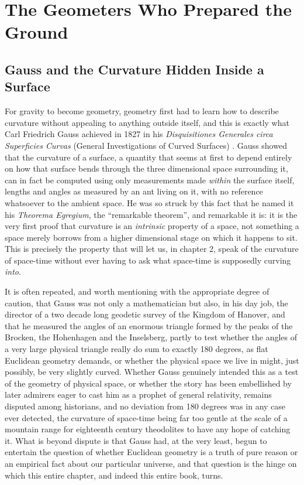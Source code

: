 \section{The Geometers Who Prepared the Ground}

    \subsection{Gauss and the Curvature Hidden Inside a Surface}

    For gravity to become geometry, geometry first had to learn how to describe curvature without appealing to anything outside itself, and this is exactly what Carl Friedrich Gauss achieved in 1827 in his \textit{Disquisitiones Generales circa Superficies Curvas} (General Investigations of Curved Surfaces) \citep{gauss1828}. Gauss showed that the curvature of a surface, a quantity that seems at first to depend entirely on how that surface bends through the three dimensional space surrounding it, can in fact be computed using only measurements made \textit{within} the surface itself, lengths and angles as measured by an ant living on it, with no reference whatsoever to the ambient space. He was so struck by this fact that he named it his \textit{Theorema Egregium}, the ``remarkable theorem'', and remarkable it is: it is the very first proof that curvature is an \textit{intrinsic} property of a space, not something a space merely borrows from a higher dimensional stage on which it happens to sit. This is precisely the property that will let us, in chapter 2, speak of the curvature of space-time without ever having to ask what space-time is supposedly curving \textit{into}.

    It is often repeated, and worth mentioning with the appropriate degree of caution, that Gauss was not only a mathematician but also, in his day job, the director of a two decade long geodetic survey of the Kingdom of Hanover, and that he measured the angles of an enormous triangle formed by the peaks of the Brocken, the Hohenhagen and the Inselsberg, partly to test whether the angles of a very large physical triangle really do sum to exactly 180 degrees, as flat Euclidean geometry demands, or whether the physical space we live in might, just possibly, be very slightly curved. Whether Gauss genuinely intended this as a test of the geometry of physical space, or whether the story has been embellished by later admirers eager to cast him as a prophet of general relativity, remains disputed among historians, and no deviation from 180 degrees was in any case ever detected, the curvature of space-time being far too gentle at the scale of a mountain range for eighteenth century theodolites to have any hope of catching it. What is beyond dispute is that Gauss had, at the very least, begun to entertain the question of whether Euclidean geometry is a truth of pure reason or an empirical fact about our particular universe, and that question is the hinge on which this entire chapter, and indeed this entire book, turns.

